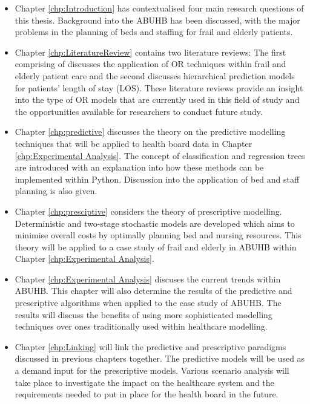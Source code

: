 \documentclass[../thesis.tex]{subfiles}
\begin{document}
\begin{itemize}
    \item Chapter \ref{chp:Introduction} has contextualised four main research questions of this thesis. Background into the ABUHB has been discussed, with the major problems in the planning of beds and staffing for frail and elderly patients.

    \item Chapter \ref{chp:LiteratureReview} contains two literature reviews: The first comprising of \cite{Williams} discusses the application of OR techniques within frail and elderly patient care and the second discusses hierarchical prediction models for patients' length of stay (LOS). These literature reviews provide an insight into the type of OR models that are currently used in this field of study and the opportunities available for researchers to conduct future study.
    
    \item Chapter \ref{chp:predictive} discusses the theory on the predictive modelling techniques that will be applied to health board data in Chapter \ref{chp:Experimental Analysis}. The concept of classification and regression trees are introduced with an explanation into how these methods can be implemented within Python. Discussion into the application of bed and staff planning is also given.
    
    \item Chapter \ref{chp:presciptive} considers the theory of prescriptive modelling. Deterministic and two-stage stochastic models are developed which aims to minimise overall costs by optimally planning bed and nursing resources. This theory will be applied to a case study of frail and elderly in ABUHB within Chapter \ref{chp:Experimental Analysis}.

    \item Chapter \ref{chp:Experimental Analysis} discuses the current trends within ABUHB. This chapter will also determine the results of the predictive and prescriptive algorithms when applied to the case study of ABUHB. The results will discuss the benefits of using more sophisticated modelling techniques over ones traditionally used within healthcare modelling.
    
    \item Chapter \ref{chp:Linking} will link the predictive and prescriptive paradigms discussed in previous chapters together. The predictive models will be used as a demand input for the prescriptive models. Various scenario analysis will take place to investigate the impact on the healthcare system and the requirements needed to put in place for the health board in the future.
    

\end{itemize}
\end{document}
